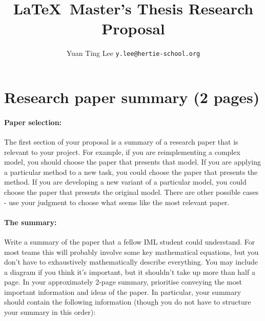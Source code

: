 \documentclass[10pt,twocolumn,letterpaper]{article}
\begin{document}
\title{\LaTeX\ Master's Thesis Research Proposal}

\author{Yuan Ting Lee  
{\tt\small y.lee@hertie-school.org}
}

\maketitle






\section{Research paper summary (2 pages)}

\paragraph{Paper selection:} The first section of your proposal is a summary of a research paper that is relevant to your project. For example, if you are reimplementing a complex model, you should choose the paper that presents that model. If you are applying a particular method to a new task, you could choose the paper that presents the method. If you are developing a new variant of a particular model, you could choose the paper that presents the original model. There are other possible cases - use your judgment to choose what seems like the most relevant paper. 

\paragraph{The summary:} Write a summary of the paper that a fellow IML student could understand. For most teams this will probably involve some key mathematical equations, but you don't have to exhaustively mathematically describe everything. You may include a diagram if you think it's important, but it shouldn't take up more than half a page. In your approximately 2-page summary, prioritise conveying the most important information and ideas of the paper. In particular, your summary should contain the following information (though you do not have to structure your summary in this order):
\end{document}
